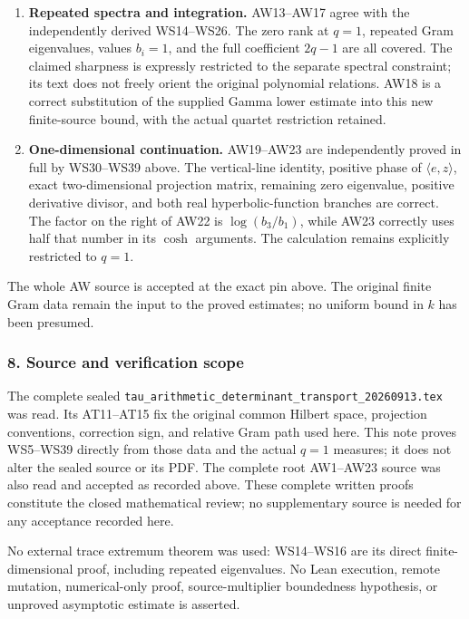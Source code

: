 \begin{enumerate}
\item
  \textbf{Repeated spectra and integration.} AW13--AW17 agree with the independently derived WS14--WS26. The zero rank at \(q=1\), repeated Gram eigenvalues, values \(b_i=1\), and the full coefficient \(2q-1\) are all covered. The claimed sharpness is expressly restricted to the separate spectral constraint; its text does not freely orient the original polynomial relations. AW18 is a correct substitution of the supplied Gamma lower estimate into this new finite-source bound, with the actual quartet restriction retained.
\item
  \textbf{One-dimensional continuation.} AW19--AW23 are independently proved in full by WS30--WS39 above. The vertical-line identity, positive phase of \(\langle e,z\rangle\), exact two-dimensional projection matrix, remaining zero eigenvalue, positive derivative divisor, and both real hyperbolic-function branches are correct. The factor on the right of AW22 is \(\log(b_3/b_1)\), while AW23 correctly uses half that number in its \(\cosh\) arguments. The calculation remains explicitly restricted to \(q=1\).
\end{enumerate}

The whole AW source is accepted at the exact pin above. The original finite Gram data remain the input to the proved estimates; no uniform bound in \(k\) has been presumed.

\subsubsection{8. Source and verification scope}\label{endpoint-window_review--source-and-verification-scope}

The complete sealed \nolinkurl{tau_arithmetic_determinant_transport_20260913.tex} was read. Its AT11--AT15 fix the original common Hilbert space, projection conventions, correction sign, and relative Gram path used here. This note proves WS5--WS39 directly from those data and the actual \(q=1\) measures; it does not alter the sealed source or its PDF. The complete root AW1--AW23 source was also read and accepted as recorded above. These complete written proofs constitute the closed mathematical review; no supplementary source is needed for any acceptance recorded here.

No external trace extremum theorem was used: WS14--WS16 are its direct finite-dimensional proof, including repeated eigenvalues. No Lean execution, remote mutation, numerical-only proof, source-multiplier boundedness hypothesis, or unproved asymptotic estimate is asserted.
